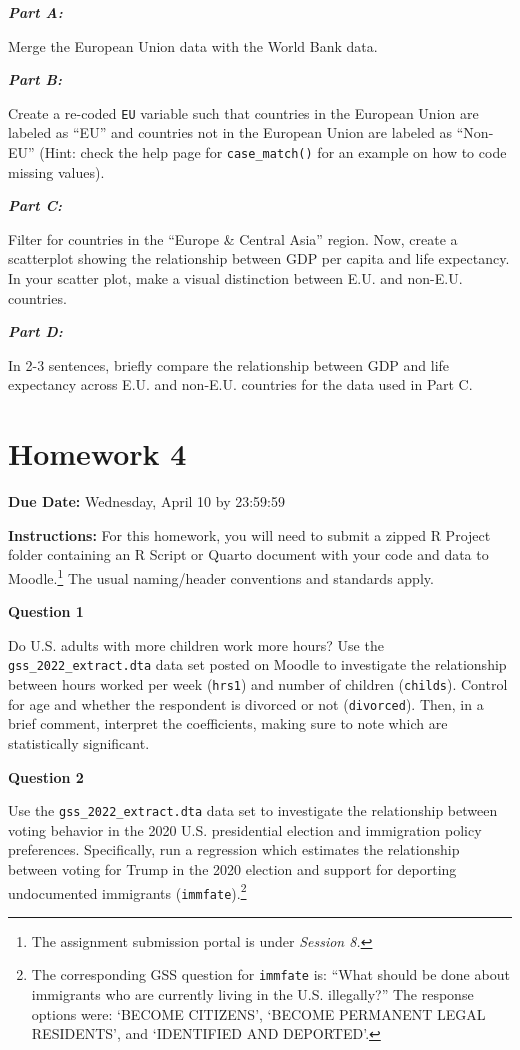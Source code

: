 \documentclass[
  letterpaper,
]{book}
\begin{document}
\textbf{\emph{Part A:}}

Merge the European Union data with the World Bank data.

\textbf{\emph{Part B:}}

Create a re-coded \texttt{EU} variable such that countries in the
European Union are labeled as ``EU'' and countries not in the European
Union are labeled as ``Non-EU'' (Hint: check the help page for
\texttt{case\_match()} for an example on how to code missing values).

\textbf{\emph{Part C:}}

Filter for countries in the ``Europe \& Central Asia'' region. Now,
create a scatterplot showing the relationship between GDP per capita and
life expectancy. In your scatter plot, make a visual distinction between
E.U. and non-E.U. countries.

\textbf{\emph{Part D:}}

In 2-3 sentences, briefly compare the relationship between GDP and life
expectancy across E.U. and non-E.U. countries for the data used in Part
C.

\hypertarget{homework-4}{%
\chapter*{Homework 4}\label{homework-4}}


\textbf{Due Date:} Wednesday, April 10 by 23:59:59

\textbf{Instructions:} For this homework, you will need to submit a
zipped R Project folder containing an R Script or Quarto document with
your code and data to Moodle.\footnote{The assignment submission portal
  is under \emph{Session 8.}} The usual naming/header conventions and
standards apply.

\textbf{Question 1}

Do U.S. adults with more children work more hours? Use the
\texttt{gss\_2022\_extract.dta} data set posted on Moodle to investigate
the relationship between hours worked per week (\texttt{hrs1}) and
number of children (\texttt{childs}). Control for age and whether the
respondent is divorced or not (\texttt{divorced}). Then, in a brief
comment, interpret the coefficients, making sure to note which are
statistically significant.

\textbf{Question 2}

Use the \texttt{gss\_2022\_extract.dta} data set to investigate the
relationship between voting behavior in the 2020 U.S. presidential
election and immigration policy preferences. Specifically, run a
regression which estimates the relationship between voting for Trump in
the 2020 election and support for deporting undocumented immigrants
(\texttt{immfate}).\footnote{The corresponding GSS question for
  \texttt{immfate} is: ``What should be done about immigrants who are
  currently living in the U.S. illegally?'' The response options were:
  `BECOME CITIZENS', `BECOME PERMANENT LEGAL RESIDENTS', and `IDENTIFIED
  AND DEPORTED'.}
\end{document}
